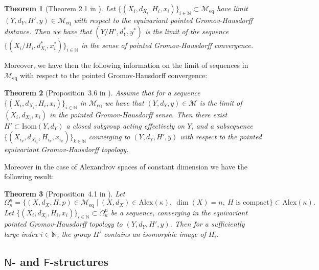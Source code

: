 \documentclass[12pt,a4paper,reqno]{amsart}
\newtheorem{theorem}{Theorem}[section]
\theoremstyle{definition}
\numberwithin{equation}{section}
\newcommand{\Alex}{\mathrm{Alex}}
\newcommand{\N}{\mathbb{N}} %
\DeclareMathOperator{\dime}{dim}
\begin{document}
\begin{theorem}[Theorem 2.1 in \cite{Fukaya1986}]\th\label{T: eqpGH convergence implies pGH convergence}
Let  $\{(X_i,d_{X_i},H_i,x_i)\}_{i\in\N}\subset \mathcal{M}_{\mathrm{eq}}$ have limit \linebreak$(Y,d_Y,H',y)\in \mathcal{M}_{\mathrm{eq}}$ with respect to the equivariant pointed Gromov-Hausdorff distance. Then we  have that $(Y/H',d_Y^\ast,y^\ast)$ is the limit of the sequence $\{(X_i/H_i,d_{X_i}^\ast,x_i^\ast)\}_{i\in \N}$ in the sense of  pointed Gromov-Hausdorff convergence.
\end{theorem}

Moreover, we have then the following information on the limit of sequences in $\mathcal{M}_{\mathrm{eq}}$ with respect to the pointed Gromov-Hausdorff convergence:

\begin{theorem}[Proposition~3.6 in \cite{FukayaYamaguchi1992}]\th\label{T: pGH-convergence implies eqGH-convergence}
Assume that for a sequence $\{(X_i,d_{X_i},H_i,x_i)\}_{i\in \N}$ in $\mathcal{M}_{\mathrm{eq}}$ we have that $(Y,d_Y,y)\in \mathcal{M}$ is the limit of $(X_i,d_{X_i},x_i)$ in the pointed Gromov-Hausdorff sense. Then there exist $H'\subset \mathrm{Isom}(Y,d_Y)$ a closed subgroup acting effectively on $Y$, and a subsequence $\{(X_{i_k},d_{X_{i_{
k}}},H_{i_k},x_{i_k})\}_{k\in \N}$ converging to $(Y,d_Y,H',y)$ with respect to the pointed equivariant Gromov-Hausdorff topology. 
\end{theorem}

Moreover in the case of Alexandrov spaces of constant dimension we have the following result:

\begin{theorem}[Proposition~4.1 in \cite{Harvey2016}]\th\label{T: equiv. convergence Alexandrov spaces}
Let 
\[
\Omega_\kappa^n = \{(X,d_X,H,p)\in \mathcal{M}_{\mathrm{eq}}\mid (X,d_X)\in \Alex (\kappa),\: \dime(X) = n,\: H\mbox{ is compact}\}\subset \Alex(\kappa).
\] 
Let $\{(X_i,d_{X_i},H_i,x_i)\}_{i\in \N}\subset\Omega^n_\kappa$ be a sequence, converging in the equivariant pointed Gromov-Hausdorff topology to $(Y,d_Y,H',y)$. Then for a sufficiently large index $i\in \N$, the group $H'$ contains an isomorphic image of $H_i$.
\end{theorem}

\subsection{\texorpdfstring{$\mathsf{N}$}{N}- and \texorpdfstring{$\mathsf{F}$}{F}-structures}\label{SS: N- and F-structures}
\end{document}
